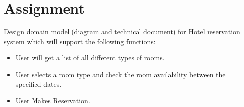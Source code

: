\section{Assignment}

Design domain model (diagram and technical document) for Hotel
reservation system which will support the following functions:

\begin{itemize}
  \item User will get a list of all different types of rooms.
  \item User selects a room type and check the room availability between the specified dates.
  \item User Makes Reservation.
\end{itemize}